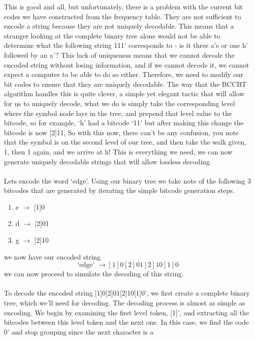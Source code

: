 \documentclass[12pt]{IEEEtran}
\begin{document}
This is good and all, but unfortunately, 
there is a problem with the current bit codes we have constructed from the frequency table. They are not sufficient to encode a string because they are not 
uniquely decodable. This means that a stranger looking at the complete binary tree alone would not be able to determine what the following string 111' corresponds to - 
is it three a's or one h' followed by an a'? This lack of uniqueness means that we cannot decode the encoded string without losing information, and if we cannot decode it,
we cannot expect a computer to be able to do so either. Therefore, we need to modify our bit codes to ensure that they are uniquely decodable. The way that the BCCBT algorithm 
handles this is quite clever, a simple yet elegant tactic that will allow for us to uniquely decode, what we do is simply take the corresponding level where the symbol node 
lays in the tree, and prepend that level value to the bitcode, so for example, `h' had a bitcode `11' but after making this change the bitcode is now [2]11, So with this now, there
can't be any confusion, you note that the symbol is on the second level of our tree, and then take the walk given, 1, then 1 again, and we arrive at h! This is everything we need,
we can now generate uniquely decodable strings that will allow lossless decoding.\\
\\
Lets encode the word `edge'. Using our binary tree we take note of the following 3 bitcodes that are generated by iterating the 
simple bitcode generation steps.
\begin{enumerate}
	\item e $\rightarrow$ [1]0
	\item d $\rightarrow$ [2]01
	\item g $\rightarrow$ [2]10
\end{enumerate}
we now have our encoded string
\begin{equation*}
	\text{`edge' } \rightarrow [1]0[2]01[2]10[1]0
\end{equation*}
we can now proceed to simulate the decoding of this string.\\
\\
To decode the encoded string [1]0[2]01[2]10[1]0', we first create a complete binary tree, which we'll need for decoding. 
The decoding process is almost as simple as encoding. We begin by examining the first level token, [1]', and extracting all the 
bitcodes between this level token and the next one. In this case, we find the code 0' and stop grouping since the next character is a 
\end{document}
